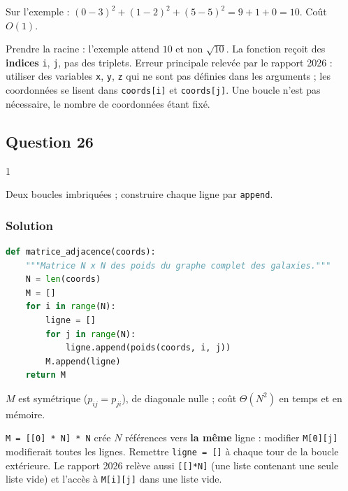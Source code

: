 \documentclass[11pt,a4paper]{article}
\begin{document}
Sur l'exemple : \((0-3)^2 + (1-2)^2 + (5-5)^2 = 9 + 1 + 0 = 10\). Coût \(O(1)\).

\begin{piege}

Prendre la racine : l'exemple attend \(10\) et non \(\sqrt{10}\). La fonction reçoit des \textbf{indices} \texttt{i}, \texttt{j}, pas des triplets. Erreur principale relevée par le rapport 2026 : utiliser des variables \texttt{x}, \texttt{y}, \texttt{z} qui ne sont pas définies dans les arguments ; les coordonnées se lisent dans \texttt{coords{[}i{]}} et \texttt{coords{[}j{]}}. Une boucle n'est pas nécessaire, le nombre de coordonnées étant fixé.

\end{piege}

\hypertarget{question-26}{%
\subsection{Question 26}\label{question-26}}

\begin{indication}{1}

Deux boucles imbriquées ; construire chaque ligne par \texttt{append}.

\end{indication}

\hypertarget{solution-25}{%
\subsubsection{Solution}\label{solution-25}}

\begin{lstlisting}[language=Python]
def matrice_adjacence(coords):
    """Matrice N x N des poids du graphe complet des galaxies."""
    N = len(coords)
    M = []
    for i in range(N):
        ligne = []
        for j in range(N):
            ligne.append(poids(coords, i, j))
        M.append(ligne)
    return M
\end{lstlisting}

\(M\) est symétrique (\(p_{ij} = p_{ji}\)), de diagonale nulle ; coût \(\Theta(N^2)\) en temps et en mémoire.

\begin{piege}

\texttt{M\ =\allowbreak{}\ {[}{[}0{]}\allowbreak{}\ *\ N{]}\allowbreak{}\ *\ N} crée \(N\) références vers \textbf{la même} ligne : modifier \texttt{M{[}0{]}{[}j{]}} modifierait toutes les lignes. Remettre \texttt{ligne\ =\ {[}{]}} à chaque tour de la boucle extérieure. Le rapport 2026 relève aussi \texttt{{[}{[}{]}*N{]}} (une liste contenant une seule liste vide) et l'accès à \texttt{M{[}i{]}{[}j{]}} dans une liste vide.

\end{piege}
\end{document}
